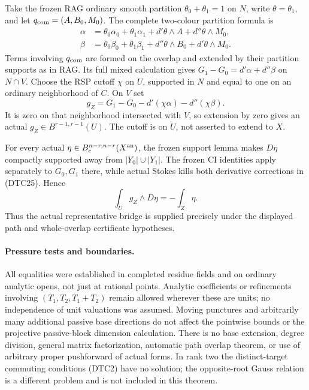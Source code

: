 Take the frozen RAG ordinary smooth partition $\theta_0+\theta_1=1$
on $N$, write $\theta=\theta_1$, and let
$q_{\rm com}=(A,B_0,M_0)$.  The complete two-colour partition formula is
\[
 \begin{split}
 \alpha&=\theta_0\alpha_0+\theta_1\alpha_1
                         +d'\theta\wedge A+d''\theta\wedge M_0,\\
 \beta&=\theta_0\beta_0+\theta_1\beta_1
                         +d''\theta\wedge B_0+d'\theta\wedge M_0.
 \end{split}
 \tag{DTC24}
\]
Terms involving $q_{\rm com}$ are formed on the overlap and extended
by their partition supports as in RAG.  Its full mixed calculation
gives $G_1-G_0=d'\alpha+d''\beta$ on $N\cap V$.
Choose the RSP cutoff $\chi$ on $U$, supported in $N$ and equal to
one on an ordinary neighborhood of $C$.  On $V$ set
\[
 g_Z=G_1-G_0-d'(\chi\alpha)-d''(\chi\beta).
 \tag{DTC25}
\]
It is zero on that neighborhood intersected with $V$, so extension
by zero gives an actual $g_Z\in B^{r-1,r-1}(U)$.  The cutoff is
on $U$, not asserted to extend to $X$.

For every actual $\eta\in B_c^{n-r,n-r}(X^{\rm an})$, the frozen
support lemma makes $D\eta$ compactly supported away from
$|Y_0|\cup|Y_1|$.  The frozen CI identities apply separately to
$G_0,G_1$ there, while actual Stokes kills both derivative corrections
in (DTC25).  Hence
\[
       \int_Ug_Z\wedge D\eta=-\int_Z\eta.
 \tag{DTC26}
\]
Thus the actual representative bridge is supplied precisely under
the displayed path and whole-overlap certificate hypotheses.

\paragraph{Pressure tests and boundaries.}
All equalities were established in completed residue fields and on
ordinary analytic opens, not just at rational points.  Analytic
coefficients or refinements involving $(T_1,T_2,T_1+T_2)$ remain
allowed wherever these are units; no independence of unit valuations
was assumed.  Moving punctures and arbitrarily many additional
passive base directions do not affect the pointwise bounds or the
projective passive-block dimension calculation.  There is no base
extension, degree division, general matrix factorization, automatic
path overlap theorem, or use of arbitrary proper pushforward of
actual forms.  In rank two the distinct-target commuting conditions
(DTC2) have no solution; the opposite-root Gauss relation is a
different problem and is not included in this theorem.

